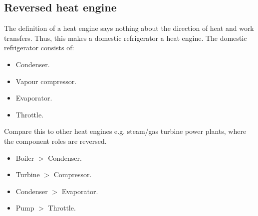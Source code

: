 \documentclass[class=report, crop=false, 12pt,a4paper]{standalone}
\begin{document}
\subsection{Reversed heat engine}
The definition of a heat engine says nothing about the direction of heat and work transfers. Thus, this makes a domestic refrigerator a heat engine. The domestic refrigerator consists of: 
\begin{multicols}{2}
  \begin{itemize}[noitemsep]
    \item Condenser.
    \item Vapour compressor.
    \item Evaporator.
    \item Throttle.
  \end{itemize}
\end{multicols}
Compare this to other heat engines e.g. steam/gas turbine power plants, where the component roles are reversed.
\begin{multicols}{2}
  \begin{itemize}[noitemsep]
    \item Boiler $>$ Condenser.
    \item Turbine $>$ Compressor.
    \item Condenser $>$ Evaporator.
    \item Pump $>$ Throttle.
  \end{itemize}
\end{multicols}
\end{document}
